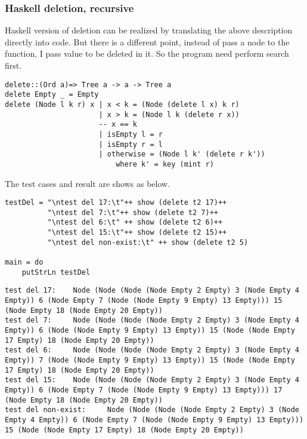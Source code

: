 \documentclass{article}
\begin{document}
\subsubsection*{Haskell deletion, recursive}

Haskell version of deletion can be realized by translating the above description
directly into code. But there is a different point, instead of pass a node to the
function, I pass value to be deleted in it. So the program need perform search first.

\lstset{language=Haskell}
\begin{lstlisting}
delete::(Ord a)=> Tree a -> a -> Tree a
delete Empty _ = Empty
delete (Node l k r) x | x < k = (Node (delete l x) k r)
                      | x > k = (Node l k (delete r x))
                      -- x == k
                      | isEmpty l = r
                      | isEmpty r = l
                      | otherwise = (Node l k' (delete r k')) 
                          where k' = key (mint r)
\end{lstlisting}

The test cases and result are shows as below.

\begin{lstlisting}
testDel = "\ntest del 17:\t"++ show (delete t2 17)++
          "\ntest del 7:\t"++ show (delete t2 7)++
          "\ntest del 6:\t" ++ show (delete t2 6)++
          "\ntest del 15:\t"++ show (delete t2 15)++
          "\ntest del non-exist:\t" ++ show (delete t2 5)

main = do
    putStrLn testDel
\end{lstlisting}

\begin{verbatim}
test del 17:    Node (Node (Node (Node Empty 2 Empty) 3 (Node Empty 4 
Empty)) 6 (Node Empty 7 (Node (Node Empty 9 Empty) 13 Empty))) 15 
(Node Empty 18 (Node Empty 20 Empty))
test del 7:     Node (Node (Node (Node Empty 2 Empty) 3 (Node Empty 4 
Empty)) 6 (Node (Node Empty 9 Empty) 13 Empty)) 15 (Node (Node Empty 
17 Empty) 18 (Node Empty 20 Empty))
test del 6:     Node (Node (Node (Node Empty 2 Empty) 3 (Node Empty 4 
Empty)) 7 (Node (Node Empty 9 Empty) 13 Empty)) 15 (Node (Node Empty 
17 Empty) 18 (Node Empty 20 Empty))
test del 15:    Node (Node (Node (Node Empty 2 Empty) 3 (Node Empty 4 
Empty)) 6 (Node Empty 7 (Node (Node Empty 9 Empty) 13 Empty))) 17 
(Node Empty 18 (Node Empty 20 Empty))
test del non-exist:     Node (Node (Node (Node Empty 2 Empty) 3 (Node 
Empty 4 Empty)) 6 (Node Empty 7 (Node (Node Empty 9 Empty) 13 Empty))) 
15 (Node (Node Empty 17 Empty) 18 (Node Empty 20 Empty))
\end{verbatim}
\end{document}

